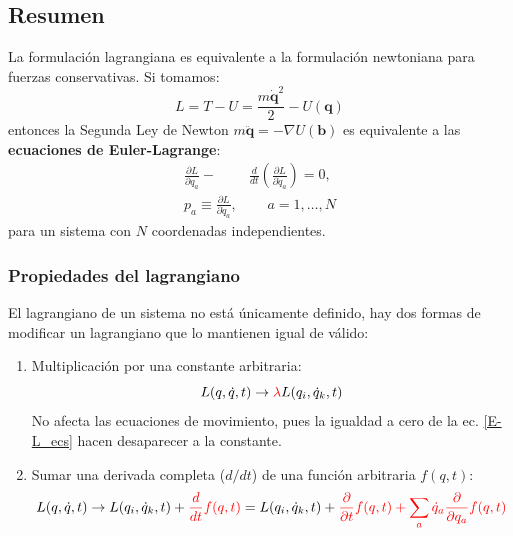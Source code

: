 \documentclass[]{article}
\numberwithin{equation}{section}
\begin{document}
\subsection{Resumen}
La formulación lagrangiana es equivalente a la formulación newtoniana para fuerzas conservativas. Si tomamos:
\begin{equation}
	L = T - U = \frac{m\dot{\mathbf{q}}^2}{2} - U(\mathbf{q})\label{L}
\end{equation}
entonces la Segunda Ley de Newton \(m\ddot{\mathbf{q}} = -\nabla U(\mathbf{b})\) es equivalente a las \textbf{ecuaciones de Euler-Lagrange}:
\begin{align}
	\frac{\partial L}{\partial q_a} - &\frac{d}{dt}\left(\frac{\partial L}{\partial \dot{q}_a}\right) = 0,\label{E-L_ecs}\\
	p_a \equiv \frac{\partial L}{\partial\dot{q}_a},&\ \ \ \ \ \ a = 1,\ldots,N\nonumber
\end{align}
para un sistema con \(N\) coordenadas independientes.

\subsubsection{Propiedades del lagrangiano}
El lagrangiano de un sistema no está únicamente definido, hay dos formas de modificar un lagrangiano que lo mantienen igual de válido:
\begin{enumerate}
	\item Multiplicación por una constante arbitraria:
	\begin{equation}
		L(q,\dot{q},t) \rightarrow \textcolor{red}{\lambda} L(q_i,\dot{q}_k,t)
	\end{equation}
	No afecta las ecuaciones de movimiento, pues la igualdad a cero de la ec. \ref{E-L_ecs} hacen desaparecer a la constante.
	\item Sumar una derivada completa (\(d/dt\)) de una función arbitraria \(f(q,t)\):
	\begin{equation}
		L(q,\dot{q},t) \rightarrow L(q_i,\dot{q}_k,t) + \textcolor{red}{\frac{d}{dt}f(q,t)} = L(q_i,\dot{q}_k,t) + \textcolor{red}{\frac{\partial}{\partial t}f(q,t) + \sum_{a}\dot{q}_a \frac{\partial}{\partial q_a}f(q,t)} \label{L+dfdt}
	\end{equation}
\end{enumerate}
\end{document}

